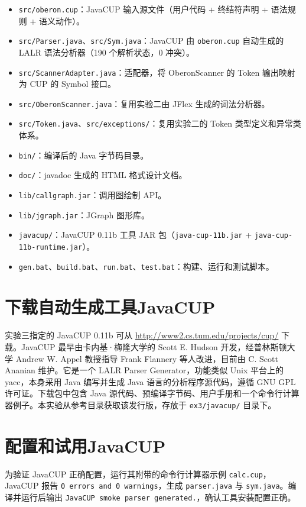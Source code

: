 \begin{itemize}
    \item \texttt{src/oberon.cup}：JavaCUP 输入源文件（用户代码 + 终结符声明 + 语法规则 + 语义动作）。
    \item \texttt{src/Parser.java}、\texttt{src/Sym.java}：JavaCUP 由 \texttt{oberon.cup} 自动生成的 LALR 语法分析器（190 个解析状态，0 冲突）。
    \item \texttt{src/ScannerAdapter.java}：适配器，将 OberonScanner 的 Token 输出映射为 CUP 的 Symbol 接口。
    \item \texttt{src/OberonScanner.java}：复用实验二由 JFlex 生成的词法分析器。
    \item \texttt{src/Token.java}、\texttt{src/exceptions/}：复用实验二的 Token 类型定义和异常类体系。
    \item \texttt{bin/}：编译后的 Java 字节码目录。
    \item \texttt{doc/}：javadoc 生成的 HTML 格式设计文档。
    \item \texttt{lib/callgraph.jar}：调用图绘制 API。
    \item \texttt{lib/jgraph.jar}：JGraph 图形库。
    \item \texttt{javacup/}：JavaCUP 0.11b 工具 JAR 包（\texttt{java-cup-11b.jar} + \texttt{java-cup-11b-runtime.jar}）。
    \item \texttt{gen.bat}、\texttt{build.bat}、\texttt{run.bat}、\texttt{test.bat}：构建、运行和测试脚本。
\end{itemize}

\section{下载自动生成工具JavaCUP}

实验三指定的 JavaCUP 0.11b 可从 \url{http://www2.cs.tum.edu/projects/cup/} 下载。JavaCUP 最早由卡内基·梅隆大学的 Scott E. Hudson 开发，经普林斯顿大学 Andrew W. Appel 教授指导 Frank Flannery 等人改进，目前由 C. Scott Ananian 维护。它是一个 LALR Parser Generator，功能类似 Unix 平台上的 yacc，本身采用 Java 编写并生成 Java 语言的分析程序源代码，遵循 GNU GPL 许可证。下载包中包含 Java 源代码、预编译字节码、用户手册和一个命令行计算器例子。本实验从参考目录获取该发行版，存放于 \texttt{ex3/javacup/} 目录下。

\section{配置和试用JavaCUP}

为验证 JavaCUP 正确配置，运行其附带的命令行计算器示例 \texttt{calc.cup}，JavaCUP 报告 \texttt{0 errors and 0 warnings}，生成 \texttt{parser.java} 与 \texttt{sym.java}。编译并运行后输出 \texttt{JavaCUP smoke parser generated.}，确认工具安装配置正确。

